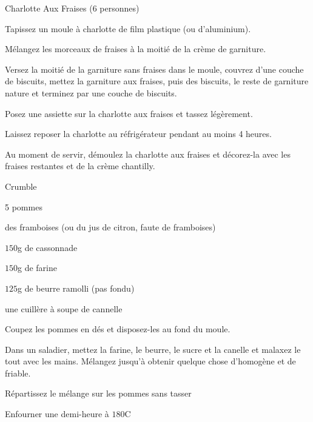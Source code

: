 \begin{recette}{Charlotte Aux Fraises (6 personnes)}
\begin{preparation}
\item[Enfin, procédez au montage de la charlotte]
\item Tapissez un moule à charlotte de film plastique (ou d'aluminium).
\item Mélangez les morceaux de fraises à la moitié de la crème de garniture.
\item Versez la moitié de la garniture sans fraises dans le moule, couvrez d'une couche de biscuits, mettez la garniture aux fraises, puis des biscuits, le reste de garniture nature et terminez par une couche de biscuits.
\item Posez une assiette sur la charlotte aux fraises et tassez légèrement.
\item Laissez reposer la charlotte au réfrigérateur pendant au moins 4 heures.
\item Au moment de servir, démoulez la charlotte aux fraises et décorez-la avec les fraises restantes et de la crème chantilly.
\end{preparation}

\end{recette}

\begin{recette}{Crumble}
\begin{ingredients}
\item 5 pommes
\item des framboises (ou du jus de citron, faute de framboises)
\item $150$g de cassonnade
\item $150$g de farine
\item $125$g de beurre ramolli (pas fondu)
\item une cuillère à soupe de cannelle
\end{ingredients}

\begin{preparation}
\item Coupez les pommes en dés et disposez-les au fond du moule.
\item Dans un saladier, mettez la farine, le beurre, le sucre et la canelle et malaxez le tout avec les mains. Mélangez jusqu'à obtenir quelque chose d'homogène et de friable.
\item Répartissez le mélange sur les pommes sans tasser
\end{preparation}

\begin{cuisson}
Enfourner une demi-heure à $180$\degres C
\end{cuisson}
\end{recette}

